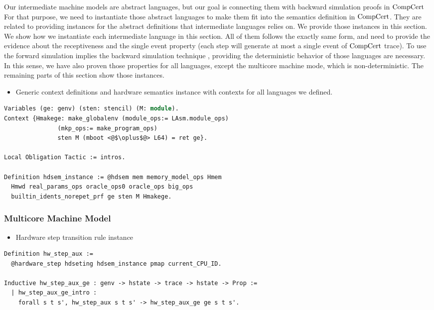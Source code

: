 Our intermediate machine models are abstract languages, but 
our goal is connecting them with backward simulation proofs in $\mathrm{CompCert}$~
For that purpose, 
we need to instantiate those abstract languages to make them fit into 
the semantics definition in $\mathrm{CompCert}$.
They are related to
providing instances 
for the abstract definitions that intermediate languages relies on. 
We provide those instances in this section. 
We show how we instantiate each intermediate language 
in this section. All of them follows the exactly same form, 
and need to provide the evidence about the receptiveness and the single event property (each step will generate at most a single event of $\mathrm{CompCert}$ trace). 
To use the forward simulation implies the backward simulation technique ,
providing the deterministic behavior of those languages 
are necessary. 
In this sense, 
we have also proven those properties 
for all languages, except the multicore machine mode, which is non-deterministic. 
The remaining parts of this section 
show those instances.

\begin{itemize}[leftmargin=*]
\item Generic context definitions and hardware semantics instance with contexts for all languages we defined.
\end{itemize}
\begin{lstlisting}[language=Caml]
Variables (ge: genv) (sten: stencil) (M: module).
Context {Hmakege: make_globalenv (module_ops:= LAsm.module_ops)
               (mkp_ops:= make_program_ops) 
               sten M (mboot <@$\oplus$@> L64) = ret ge}.        
    
Local Obligation Tactic := intros.
    
Definition hdsem_instance := @hdsem mem memory_model_ops Hmem 
  Hmwd real_params_ops oracle_ops0 oracle_ops big_ops 
  builtin_idents_norepet_prf ge sten M Hmakege.    
\end{lstlisting}

\subsubsection{Multicore Machine Model}

\begin{itemize}[leftmargin=*]
\item Hardware step transition rule instance
\end{itemize}
\begin{lstlisting}[language=Caml]
Definition hw_step_aux :=
  @hardware_step hdseting hdsem_instance pmap current_CPU_ID.

Inductive hw_step_aux_ge : genv -> hstate -> trace -> hstate -> Prop :=
  | hw_step_aux_ge_intro : 
    forall s t s', hw_step_aux s t s' -> hw_step_aux_ge ge s t s'.
\end{lstlisting}

